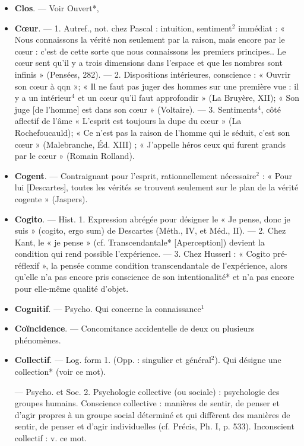 \begin{itemize}[leftmargin=1cm, label=, itemsep=11pt]
\item {\bf Clos}. — Voir Ouvert*,

\item {\bf Cœur}. — 1. Autref., not. chez Pascal :
intuition, sentiment$^2$ immédiat :
« Nous connaissons la vérité non
seulement par la raison, mais encore
par le cœur : c’est de cette sorte que
nous connaissons les premiers principes.. Le cœur sent qu’il y a trois
dimensions dans l’espace et que les
nombres sont infinis » (Pensées, 282).
— 2. Dispositions intérieures, conscience : « Ouvrir son cœur à qqn »;
« Il ne faut pas juger des hommes
sur une première vue : il y a un
intérieur$^4$ et un cœur qu'il faut
approfondir » (La Bruyère, XII);
« Son juge [de l'homme] est dans
son cœur » (Voltaire). — 3. Sentiments$^4$, côté aflectif de l'âme
« L'esprit est toujours la dupe du
cœur » (La Rochefoucauld); « Ce
n'est pas la raison de l’homme qui
le séduit, c’est son cœur » (Malebranche, Éd. XIII) ; « J’appelle héros
ceux qui furent grands par le cœur »
(Romain Rolland).

\item {\bf Cogent}. — Contraignant pour l'esprit,
rationnellement nécessaire$^2$ : « Pour
lui [Descartes], toutes les vérités se
trouvent seulement sur le plan de la
vérité cogente » (Jaspers).
%

\item {\bf Cogito}. — Hist. 1. Expression abrégée
pour désigner le « Je pense, donc je
suis » (cogito, ergo sum) de Descartes
(Méth., IV, et Méd., II). — 2. Chez
Kant, le « je pense » (cf. Transcendantale* [Aperception]) devient la
condition qui rend possible l’expérience. — 3. Chez Husserl : « Cogito
pré-réflexif », la pensée comme condition transcendantale de l’expérience, alors qu’elle n'a pas encore
pris conscience de son intentionalité*
et n’a pas encore pour elle-même
qualité d'objet.

\item {\bf Cognitif}. — Psycho. Qui concerne la
connaissance$^1$

\item {\bf Coïncidence}. — Concomitance accidentelle de deux ou plusieurs phénomènes.

\item {\bf Collectif}. — Log. form 1. (Opp. : singulier et général$^2$). Qui désigne une
collection* (voir ce mot).

— Psycho. et Soc. 2. Psychologie
collective (ou sociale) : psychologie
des groupes humains. Conscience
collective : manières de sentir, de
penser et d’agir propres à un groupe
social déterminé et qui diffèrent des
manières de sentir, de penser et
d'agir individuelles (cf. Précis, Ph. I,
p. 533). Inconscient collectif : v. ce
mot.


\end{itemize}
